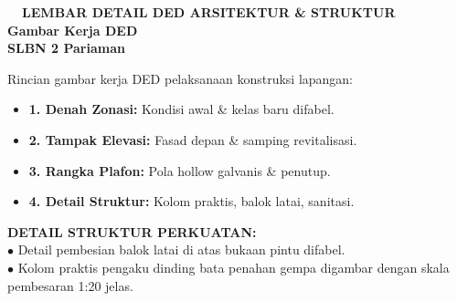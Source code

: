 \documentclass[10pt,a4paper,landscape]{article}
\begin{document}
\noindent
\begin{minipage}[t]{0.30\linewidth}
  \vspace{0pt}
  \begin{tcolorbox}[sharp corners, boxrule=0.8pt, colframe=pborder, colback=white, left=3mm, right=3mm, top=2.5mm, bottom=2.5mm, height=100mm]
    \colorbox{pred}{\fontsize{7pt}{8pt}\selectfont\bfseries\color{white}\ \ LEMBAR DETAIL DED ARSITEKTUR \& STRUKTUR\ \ }\\[1.5mm]
    {\fontsize{9.5pt}{11.5pt}\selectfont\bfseries\color{pnavy}Gambar Kerja DED}\\[0.5mm]
    {\fontsize{7pt}{8.5pt}\selectfont\bfseries\color{pred}SLBN 2 Pariaman}\\[2mm]

    {\fontsize{6.5pt}{8.2pt}\selectfont\color{psteel}
    Rincian gambar kerja DED pelaksanaan konstruksi lapangan:
    \begin{itemize}[leftmargin=3mm, itemsep=0.6mm, topsep=0mm]
      \item \textbf{1. Denah Zonasi:} Kondisi awal \& kelas baru difabel.
      \item \textbf{2. Tampak Elevasi:} Fasad depan \& samping revitalisasi.
      \item \textbf{3. Rangka Plafon:} Pola hollow galvanis \& penutup.
      \item \textbf{4. Detail Struktur:} Kolom praktis, balok latai, sanitasi.
    \end{itemize}
    }
  \end{tcolorbox}
  \vspace{2mm}

  \begin{tcolorbox}[sharp corners, boxrule=0.6pt, colframe=pnavy, colback=pbglight, left=2.5mm, right=2.5mm, top=2mm, bottom=2mm, height=52mm]
    {\fontsize{7pt}{8.5pt}\selectfont\bfseries\color{pnavy}DETAIL STRUKTUR PERKUATAN:}\\[1.5mm]
    {\fontsize{6.5pt}{8.2pt}\selectfont\color{psteel}
    $\bullet$ Detail pembesian balok latai di atas bukaan pintu difabel.\\
    $\bullet$ Kolom praktis pengaku dinding bata penahan gempa digambar dengan skala pembesaran 1:20 jelas.
    }
  \end{tcolorbox}
\end{minipage}%
\hfill
\end{document}
